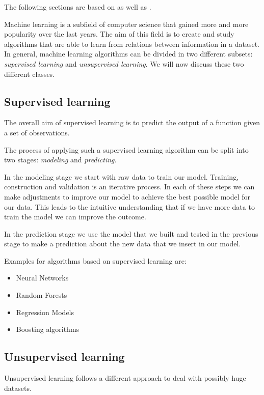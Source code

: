 \documentclass[12pt, a4paper]{article}
\numberwithin{equation}{section}
\numberwithin{figure}{section}
\numberwithin{table}{section}
\begin{document}
	The following sections are based on \citet{unsupervisedlearning} as well as \citet{elementsofstatisticallearning}.
	
	Machine learning is a subfield of computer science that gained more and more popularity over the last years.
	The aim of this field is to create and study algorithms that are able to learn from relations between information in a dataset.
	In general, machine learning algorithms can be divided in two different subsets: \textit{supervised learning} and \textit{unsupervised learning}.
	We will now discuss these two different classes.
	
	\subsection{Supervised learning}\label{supervised}
	
	The overall aim of supervised learning is to predict the output of a function given a set of observations. %
	
	
	The process of applying such a supervised learning algorithm can be split into two stages: \textit{modeling} and \textit{predicting}.
	
	In the modeling stage we start with raw data to train our model.
	Training, construction and validation is an iterative process.
	In each of these steps we can make adjustments to improve our model to achieve the best possible model for our data.
	This leads to the intuitive understanding that if we have more data to train the model we can improve the outcome. %
	
	In the prediction stage we use the model that we built and tested in the previous stage to make a prediction about the new data that we insert in our model.
	
	Examples for algorithms based on supervised learning are:
	\begin{itemize}
		\item Neural Networks
		\item Random Forests
		\item Regression Models
		\item Boosting algorithms
	\end{itemize}
	
	\subsection{Unsupervised learning}\label{unsupervised}
	Unsupervised learning follows a different approach to deal with possibly huge datasets.
	
\end{document}
